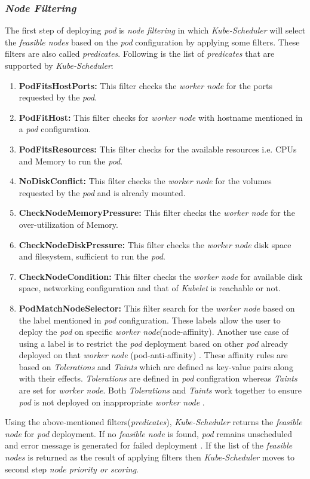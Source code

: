 \subsubsection{\emph{Node Filtering}}
\label{sec:node-filter}
The first step of deploying \emph{pod} is \emph{node filtering} in which \emph{Kube-Scheduler} will select the \emph{feasible nodes} based on the \emph{pod} configuration by applying some filters. These filters are also called \emph{predicates}. Following is the list of \emph{predicates} that are supported by \emph{Kube-Scheduler}\cite{k8s}:
\begin{enumerate}
  \item \textbf{PodFitsHostPorts:} This filter checks the \emph{worker node} for the ports requested by the \emph{pod}.
  \item \textbf{PodFitHost:} This filter checks for \emph{worker node} with hostname mentioned in a \emph{pod} configuration.
  \item \textbf{PodFitsResources:} This filter checks for the available resources i.e. CPUs and Memory to run the \emph{pod}.
  \item \textbf{NoDiskConflict:} This filter checks the \emph{worker node} for the volumes requested by the \emph{pod} and is already mounted.
  \item \textbf{CheckNodeMemoryPressure:} This filter checks the \emph{worker node} for the over-utilization of Memory.
  \item \textbf{CheckNodeDiskPressure:} This filter checks the \emph{worker node} disk space and filesystem, sufficient to run the \emph{pod}.
  \item \textbf{CheckNodeCondition:} This filter checks the \emph{worker node} for available disk space, networking configuration and that of \emph{Kubelet} is reachable or not.
  \item \textbf{PodMatchNodeSelector:} This filter search for the \emph{worker node} based on the label mentioned in \emph{pod} configuration. These labels allow the user to deploy the \emph{pod} on specific \emph{worker node}(node-affinity)\cite{Santos2019}. Another use case of using a label is to restrict the \emph{pod} deployment based on other \emph{pod} already deployed on that \emph{worker node} (pod-anti-affinity) \cite{Santos2019}. These affinity rules are based on \emph{Tolerations} and \emph{Taints} which are defined as key-value pairs along with their effects. \emph{Tolerations} are defined in \emph{pod} configration whereas \emph{Taints} are set for \emph{worker node}. Both \emph{Tolerations} and \emph{Taints} work together to ensure \emph{pod} is not deployed on inappropriate \emph{worker node} \cite{k8s}.
\end{enumerate}
Using the above-mentioned filters(\emph{predicates}), \emph{Kube-Scheduler} returns the \emph{feasible node} for \emph{pod} deployment. If no \emph{feasible node} is found, \emph{pod} remains unscheduled and error message is generated for failed deployment \cite{Santos2019}. If the list of the \emph{feasible nodes} is returned as the result of applying filters then \emph{Kube-Scheduler} moves to second step \emph{node priority or scoring}.
